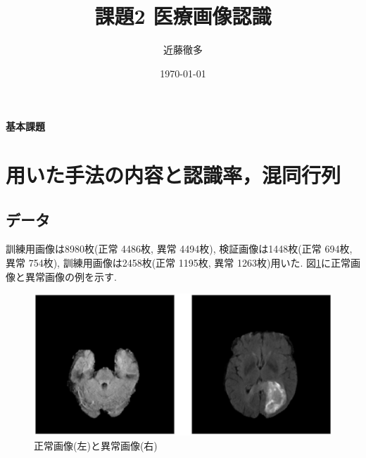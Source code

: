 
\graphicspath{{./pic/}}
\setlength{\textwidth}{16.2cm}%
\setlength{\textheight}{23cm}%
\setlength{\topmargin}{-1.5cm}
\setlength{\oddsidemargin}{0cm}
\setlength{\evensidemargin}{0cm}
\setlength{\parskip}{1pt}
\pagestyle{fancy}
\rhead[\today]{\today}
\title{課題2 医療画像認識}
\author{近藤徹多}
\date{\today}



	\maketitle
	\vspace*{20pt}

	\begin{center}
		{\LARGE \bf 基本課題}
	\end{center}
	\addtocounter{section}{0}
	\section{用いた手法の内容と認識率，混同行列}
	\subsection{データ}
	訓練用画像は8980枚(正常 4486枚, 異常 4494枚), 検証画像は1448枚(正常 694枚, 異常 754枚),
	訓練用画像は2458枚(正常 1195枚, 異常 1263枚)用いた.
	図\ref{image_example}に正常画像と異常画像の例を示す.

	\begin{figure}[htbp]
		\begin{center}
			\includegraphics[width=12cm]{image_example.eps}
			\caption{正常画像(左)と異常画像(右)}
			\label{image_example}
		\end{center}
	\end{figure}


